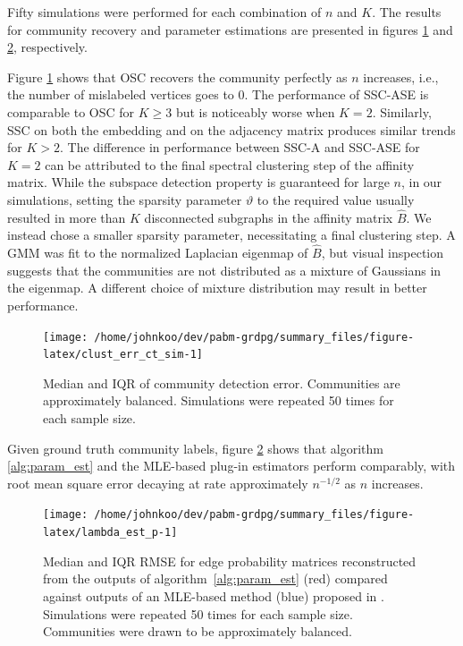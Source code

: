 \documentclass[
  11pt,
]{article}
\theoremstyle{definition}
\theoremstyle{definition}
\theoremstyle{definition}
\theoremstyle{definition}
\theoremstyle{remark}
\begin{document}
Fifty simulations were performed for each combination of \(n\) and \(K\).
The results for community recovery and parameter estimations are presented in figures \ref{fig:clust_err_ct_sim} and \ref{fig:p_block_est}, respectively.

Figure \ref{fig:clust_err_ct_sim} shows that OSC recovers the community
perfectly as \(n\) increases, i.e., the number of mislabeled vertices
goes to \(0\).
The performance of SSC-ASE is comparable to OSC for \(K \geq 3\) but is noticeably worse when \(K = 2\).
Similarly, SSC on both the embedding and on the adjacency matrix produces similar trends for \(K > 2\).
The difference in performance between SSC-A and SSC-ASE for \(K = 2\) can be attributed to the final spectral clustering step of the affinity matrix. While the subspace detection property is guaranteed for large \(n\), in our simulations, setting the
sparsity parameter \(\vartheta\) to the required value usually resulted
in more than \(K\) disconnected subgraphs in the affinity matrix
\(\hat{B}\).
We instead chose a smaller sparsity parameter,
necessitating a final clustering step.
A GMM was fit to the normalized Laplacian eigenmap of \(\hat{B}\),
but visual inspection suggests that the communities are not
distributed as a mixture of Gaussians in the eigenmap.
A different choice of mixture distribution may result in better performance.

\begin{figure}[tp]
{\centering \texttt{[image: /home/johnkoo/dev/pabm-grdpg/summary\_files/figure-latex/clust\_err\_ct\_sim-1]}
}
\caption{Median and IQR of community detection error. Communities are approximately balanced. Simulations were repeated 50 times for each sample size.}
\label{fig:clust_err_ct_sim}
\end{figure}

Given ground truth community labels, figure \ref{fig:p_block_est} shows
that algorithm \ref{alg:param_est} and the MLE-based
plug-in estimators perform comparably, with root mean square
error decaying at rate approximately \(n^{-1/2}\) as \(n\) increases.

\begin{figure}[tp]
{\centering \texttt{[image: /home/johnkoo/dev/pabm-grdpg/summary\_files/figure-latex/lambda\_est\_p-1]}}
\caption{Median and IQR RMSE for edge probability matrices
  reconstructed from the outputs of algorithm~\ref{alg:param_est}
  (red) compared against outputs of an MLE-based method (blue) proposed in \citet{307cbeb9b1be48299388437423d94bf1}.
  Simulations were repeated 50 times for each sample size. Communities were drawn to be approximately balanced.}
\label{fig:p_block_est}
\end{figure}
\end{document}
